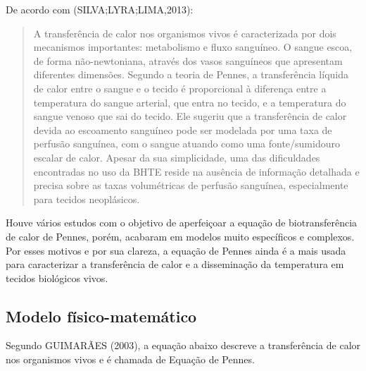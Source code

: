       De acordo com (SILVA;LYRA;LIMA,2013):
 \begin{quotation}
     
       A transferência de calor nos organismos vivos é caracterizada por dois mecanismos importantes: metabolismo e fluxo sanguíneo. O sangue escoa, de forma não-newtoniana, através dos vasos sanguíneos que apresentam diferentes dimensões. Segundo a teoria de Pennes, a transferência líquida de calor entre o sangue e o tecido é proporcional à diferença entre a temperatura do sangue arterial, que entra no tecido, e a temperatura do sangue venoso que sai do tecido. Ele sugeriu que a transferência de calor devida ao escoamento sanguíneo pode ser modelada por uma taxa de perfusão sanguínea, com o sangue atuando como uma fonte/sumidouro escalar de calor. Apesar da sua simplicidade, uma das dificuldades encontradas no uso da BHTE reside na ausência de informação detalhada e precisa sobre as taxas volumétricas de perfusão sanguínea, especialmente para tecidos neoplásicos.\end{quotation}

      Houve vários estudos com o objetivo de aperfeiçoar a equação de biotransferência de calor de Pennes, porém, acabaram em modelos muito específicos e complexos. Por esses motivos e por sua clareza, a equação de Pennes ainda é a mais usada para caracterizar a transferência de calor e a disseminação da temperatura em tecidos biológicos vivos.




 \subsection{Modelo físico-matemático}

    Segundo GUIMARÃES (2003), a equação abaixo descreve a transferência de calor nos organismos vivos e é chamada de Equação de Pennes. 
   

